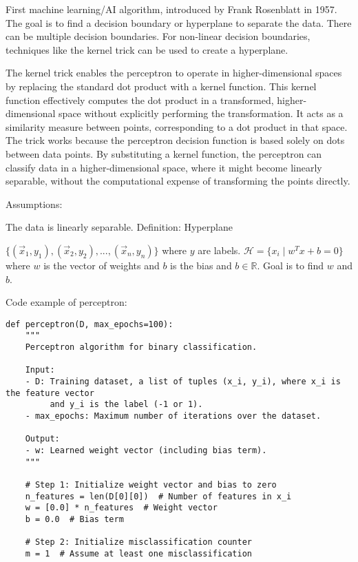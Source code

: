 \begin{outline}
    \1 First machine learning/AI algorithm, introduced by Frank Rosenblatt in 1957.
    \1 The goal is to find a decision boundary or hyperplane to separate the data. There can be multiple decision boundaries.
    \1 For non-linear decision boundaries, techniques like the kernel trick can be used to create a hyperplane.

    The kernel trick enables the perceptron to operate in higher-dimensional spaces by replacing the standard dot product with a kernel function. This kernel function effectively computes the dot product in a transformed, higher-dimensional space without explicitly performing the transformation. It acts as a similarity measure between points, corresponding to a dot product in that space. The trick works because the perceptron decision function is based solely on dots between data points. By substituting a kernel function, the perceptron can classify data in a higher-dimensional space, where it might become linearly separable, without the computational expense of transforming the points directly.
 
    \1 Assumptions:
    
        \2 The data is linearly separable.
    \1 Definition: Hyperplane
    
        \2 $\{(\vec{x}_1,y_1),(\vec{x}_2,y_2),...,(\vec{x}_n,y_n)\}$ where $y$ are labels.
        \2 $\mathcal{H}=\{x_i\mid w^Tx+b=0\}$ where $w$ is the vector of weights and $b$ is the bias and $b\in\mathbb{R}$.
        \2 Goal is to find $w$ and $b$.

    \1 Code example of perceptron:
    \begin{verbatim}
def perceptron(D, max_epochs=100):
    """
    Perceptron algorithm for binary classification.

    Input:
    - D: Training dataset, a list of tuples (x_i, y_i), where x_i is the feature vector 
         and y_i is the label (-1 or 1).
    - max_epochs: Maximum number of iterations over the dataset.

    Output:
    - w: Learned weight vector (including bias term).
    """
    
    # Step 1: Initialize weight vector and bias to zero
    n_features = len(D[0][0])  # Number of features in x_i
    w = [0.0] * n_features  # Weight vector
    b = 0.0  # Bias term
    
    # Step 2: Initialize misclassification counter
    m = 1  # Assume at least one misclassification
    

\end{verbatim}
\end{outline}
